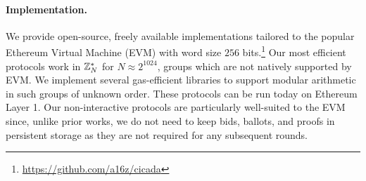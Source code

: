
\paragraph{Implementation.}
We provide open-source, freely available implementations tailored to the popular Ethereum Virtual Machine (EVM) with word size $256$ bits.\footnote{\url{https://github.com/a16z/cicada}} Our most efficient protocols work in $\mathbb{Z}_N^*$ for $N\approx 2^{1024}$, groups which are not natively supported by EVM. We implement several gas-efficient libraries to support modular arithmetic in such groups of unknown order. These protocols can be run today on Ethereum Layer 1. Our non-interactive protocols are particularly well-suited to the EVM since, unlike prior works, we do not need to keep bids, ballots, and proofs in persistent storage as they are not required for any subsequent rounds.